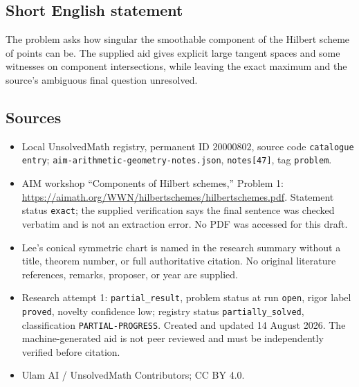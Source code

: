 \documentclass[11pt]{article}
\begin{document}
\subsection{Short English statement}
The problem asks how singular the smoothable component of the Hilbert scheme of points can be. The supplied aid gives explicit large tangent spaces and some witnesses on component intersections, while leaving the exact maximum and the source's ambiguous final question unresolved.
\subsection{Sources}
\begin{itemize}
\item Local UnsolvedMath registry, permanent ID \(20000802\), source code \texttt{catalogue entry}; \texttt{aim-arithmetic-geometry-notes.json}, \texttt{notes[47]}, tag \texttt{problem}.
\item AIM workshop ``Components of Hilbert schemes,'' Problem 1: \url{https://aimath.org/WWN/hilbertschemes/hilbertschemes.pdf}. Statement status \texttt{exact}; the supplied verification says the final sentence was checked verbatim and is not an extraction error. No PDF was accessed for this draft.
\item Lee's conical symmetric chart is named in the research summary without a title, theorem number, or full authoritative citation. No original literature references, remarks, proposer, or year are supplied.
\item Research attempt 1: \texttt{partial\_result}, problem status at run \texttt{open}, rigor label \texttt{proved}, novelty confidence low; registry status \texttt{partially\_solved}, classification \texttt{PARTIAL-PROGRESS}. Created and updated 14 August 2026. The machine-generated aid is not peer reviewed and must be independently verified before citation.
\item Ulam AI / UnsolvedMath Contributors; CC BY 4.0.
\end{itemize}
\end{document}
